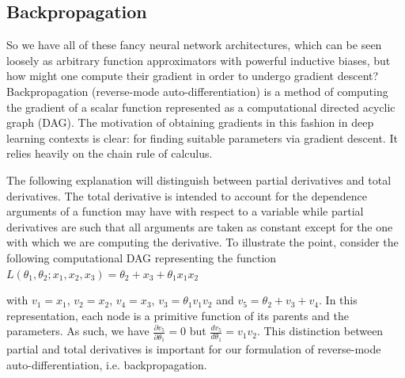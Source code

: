 \documentclass[11pt]{article}
\begin{document}
\subsection{Backpropagation}
So we have all of these fancy neural network architectures, which can be seen loosely as arbitrary function approximators with powerful inductive biases, but how might one compute their gradient in order to undergo gradient descent? Backpropagation (reverse-mode auto-differentiation) is a method of computing the gradient of a scalar function represented as a computational directed acyclic graph (DAG). The motivation of obtaining gradients in this fashion in deep learning contexts is clear: for finding suitable parameters via gradient descent. It relies heavily on the chain rule of calculus.

The following explanation will distinguish between partial derivatives and total derivatives. The total derivative is intended to account for the dependence arguments of a function may have with respect to a variable while partial derivatives are such that all arguments are taken as constant except for the one with which we are computing the derivative. To illustrate the point, consider the following computational DAG representing the function $L(\theta_1,\theta_2;x_1,x_2,x_3)=\theta_2+x_3+\theta_1x_1x_2$
\begin{center}
\end{center}
with $v_1=x_1$, $v_2=x_2$, $v_4=x_3$, $v_3=\theta_1v_1v_2$ and $v_5=\theta_2+v_3+v_4$. In this representation, each node is a primitive function of its parents and the parameters. As such, we have $\frac{\partial v_5}{\partial \theta_1}=0$ but $\frac{dv_5}{d\theta_1}=v_1v_2$. This distinction between partial and total derivatives is important for our formulation of reverse-mode auto-differentiation, i.e. backpropagation.
\end{document}
